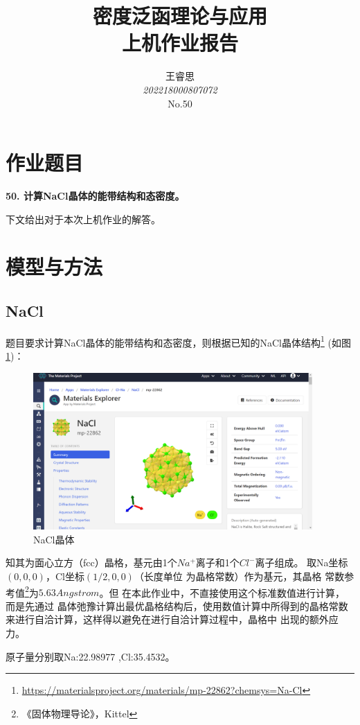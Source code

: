\documentclass[UTF8]{ctexart}
\title{\vskip 4cm \textbf{密度泛函理论与应用} \\  \huge 上机作业报告 \vskip 2cm}
\author{\kaishu 王睿思 \\ \emph{202218000807072} \\ No.50 \\  }
\date{}
\numberwithin{figure}{section}  %
\numberwithin{table}{section}
\numberwithin{equation}{section}
\begin{document}
    
    \maketitle
    \clearpage

    \tableofcontents
    \clearpage

\section{作业题目}
    \textbf{50. 计算NaCl晶体的能带结构和态密度。}\par 
    下文给出对于本次上机作业的解答。

\section{模型与方法}

    \subsection{NaCl}
        题目要求计算NaCl晶体的能带结构和态密度，则根据已知的NaCl晶体结构\footnote{\url{https://materialsproject.org/materials/mp-22862?chemsys=Na-Cl}}
        (如图\ref{fig:1})：

        \begin{figure}[H]
            \centering
            \includegraphics[width=0.95\textwidth]{Screenshot 2022-11-12 131050.png}
            \caption{NaCl晶体}
            \label{fig:1}
        \end{figure}

        知其为面心立方（fcc）晶格，基元由1个$Na^+$离子和1个$Cl^-$离子组成。
    取Na坐标$(0,0,0)$，Cl坐标$(1/2,0,0)$（长度单位
    为晶格常数）作为基元，其晶格
    常数参考值\footnote{《固体物理导论》，Kittel}为$5.63 Angstrom$。但
    在本此作业中，不直接使用这个标准数值进行计算，而是先通过
    晶体弛豫计算出最优晶格结构后，使用数值计算中所得到的晶格常数
    来进行自洽计算，这样得以避免在进行自洽计算过程中，晶格中
    出现的额外应力。\par 
        原子量分别取Na:22.98977 ,Cl:35.4532。
\end{document}
